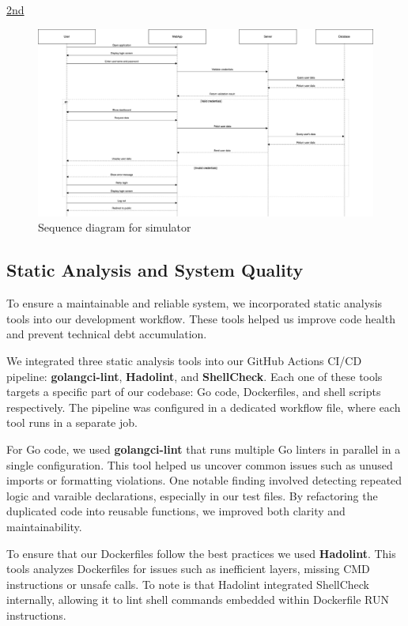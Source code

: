 \href{https://drive.google.com/file/d/1UtkS9Ijj9L4FBIYaqHKRZSK_WOFRrOoa/view?usp=sharing}{2nd}
\begin{figure}[H]
  \centering
  \includegraphics[width=\textwidth]{images/flow.png}
  \caption{Sequence diagram for simulator}
  \label{fig:simulator-interaction}
\end{figure}


\subsection{Static Analysis and System Quality}
To ensure a maintainable and reliable system, we incorporated static analysis tools into our development workflow. These tools helped us improve code health and prevent technical debt accumulation.

We integrated three static analysis tools into our GitHub Actions CI/CD pipeline: \textbf{golangci-lint}, \textbf{Hadolint}, and \textbf{ShellCheck}. Each one of these tools targets a specific part of our codebase: Go code, Dockerfiles, and shell scripts respectively. The pipeline was configured in a dedicated workflow file, where each tool runs in a separate job.


For Go code, we used \textbf{golangci-lint} that runs multiple Go linters in parallel in a single configuration. This tool helped us uncover common issues such as unused imports or formatting violations. One notable finding involved detecting repeated logic and varaible declarations, especially in our test files. By refactoring the duplicated code into reusable functions, we improved both clarity and maintainability.

To ensure that our Dockerfiles follow the best practices we used \textbf{Hadolint}. This tools analyzes Dockerfiles for issues such as inefficient layers, missing CMD instructions or unsafe calls. To note is that Hadolint integrated ShellCheck internally, allowing it to lint shell commands embedded within Dockerfile RUN instructions.


